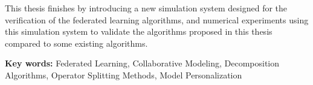 This thesis finishes by introducing a new simulation system designed for the verification of the federated learning algorithms, and numerical experiments using this simulation system to validate the algorithms proposed in this thesis compared to some existing algorithms.

\par
\bigskip

{\bf Key words:} Federated Learning, Collaborative Modeling, Decomposition Algorithms, Operator Splitting Methods, Model Personalization



